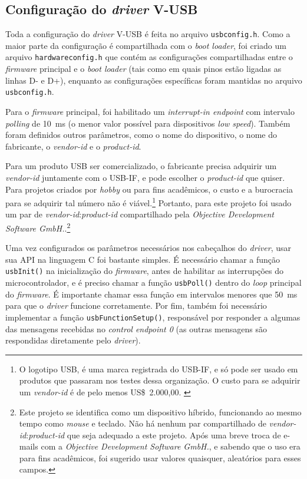 \documentclass[brazil,pagestart=firstchapter]{abnt}
\newcommand*{\VUSB}{\mbox{V-USB}\xspace}
\begin{document}
\subsection{Configuração do \textit{driver} \VUSB}
\label{sub:vusb_config}

Toda a configuração do \textit{driver} \VUSB é feita no arquivo
\texttt{usbconfig.h}. Como a maior parte da configuração é compartilhada com
o \textit{boot loader}, foi criado um arquivo \texttt{hardwareconfig.h} que
contém as configurações compartilhadas entre o \textit{firmware} principal e
o \textit{boot loader} (tais como em quais pinos estão ligadas as linhas D-
e D+), enquanto as configurações específicas foram mantidas no arquivo
\texttt{usbconfig.h}.

Para o \textit{firmware} principal, foi habilitado um \textit{interrupt-in
endpoint} com intervalo \textit{polling} de \SI{10}{\milli\second} (o menor
valor possível para dispositivos \textit{low speed}). Também foram definidos
outros parâmetros, como o nome do dispositivo, o nome do fabricante, o
\textit{vendor-id} e o \textit{product-id}.

Para um produto \ac{USB} ser comercializado, o fabricante precisa adquirir
um \textit{vendor-id} juntamente com o \ac{USB-IF}, e pode escolher o
\textit{product-id} que quiser. Para projetos criados por \textit{hobby} ou
para fins acadêmicos, o custo e a burocracia para se adquirir tal número não
é viável.\footnote{
	O logotipo USB, é uma marca registrada do \ac{USB-IF}, e só pode ser
	usado em produtos que passaram nos testes dessa organização.
	\cite{USBlogo} O custo para se adquirir um \textit{vendor-id} é de
	pelo menos US\$~2.000,00. \cite{USBvendor}
}
Portanto, para este projeto foi usado um par de
\textit{vendor-id}:\textit{product-id} compartilhado pela \textit{Objective
Development Software GmbH.}.\footnote{
	Este projeto se identifica como um dispositivo híbrido, funcionando ao
	mesmo tempo como \textit{mouse} e teclado. Não há nenhum par
	compartilhado de \textit{vendor-id}:\textit{product-id} que seja
	adequado a este projeto.  \cite[USB-IDs-for-free.txt]{VUSBdriver} Após
	uma breve troca de e-mails com a \textit{Objective Development Software
	GmbH.}, e sabendo que o uso era para fins acadêmicos, foi sugerido usar
	valores quaisquer, aleatórios para esses campos.
}

Uma vez configurados os parâmetros necessários nos cabeçalhos do
\textit{driver}, usar sua \ac{API} na linguagem C foi bastante simples. É
necessário chamar a função \texttt{usbInit()} na inicialização do
\textit{firmware}, antes de habilitar as interrupções do microcontrolador, e
é preciso chamar a função \texttt{usbPoll()} dentro do \textit{loop}
principal do \textit{firmware}. É importante chamar essa função em
intervalos menores que \SI{50}{\milli\second} para que o \textit{driver}
funcione corretamente. Por fim, também foi necessário implementar a função
\texttt{usbFunctionSetup()}, responsável por responder a algumas das
mensagens recebidas no \textit{control endpoint 0} (as outras mensagens são
respondidas diretamente pelo \textit{driver}). \cite{WikiDotDriverApi}
\end{document}
